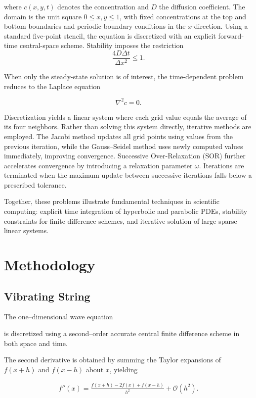 \documentclass[10pt, journal]{IEEEtran}
\begin{document}
where $c(x,y,t)$ denotes the concentration and $D$ the diffusion coefficient. The domain is the unit square $0 \le x,y \le 1$, with fixed concentrations at the top and bottom boundaries and periodic boundary conditions in the $x$-direction. Using a standard five-point stencil, the equation is discretized with an explicit forward-time central-space scheme. Stability imposes the restriction
\[
\frac{4D \Delta t}{\Delta x^2} \le 1.
\]

When only the steady-state solution is of interest, the time-dependent problem reduces to the Laplace equation

\begin{equation}
\nabla^2 c = 0.
\end{equation}

Discretization yields a linear system where each grid value equals the average of its four neighbors. Rather than solving this system directly, iterative methods are employed. The Jacobi method updates all grid points using values from the previous iteration, while the Gauss–Seidel method uses newly computed values immediately, improving convergence. Successive Over-Relaxation (SOR) further accelerates convergence by introducing a relaxation parameter $\omega$. Iterations are terminated when the maximum update between successive iterations falls below a prescribed tolerance.

Together, these problems illustrate fundamental techniques in scientific computing: explicit time integration of hyperbolic and parabolic PDEs, stability constraints for finite difference schemes, and iterative solution of large sparse linear systems.

\section{Methodology}

    \subsection{Vibrating String}
    
        The one–dimensional wave equation
        
        is discretized using a second–order accurate central finite difference scheme in both space and time.
        
        The second derivative is obtained by summing the Taylor expansions of $f(x+h)$ and $f(x-h)$ about $x$, yielding
        
        \begin{align}
        f''(x)=\frac{f(x+h) - 2f(x) + f(x-h)}{h^2}
        +\mathcal{O}(h^2).
        \label{eq:2nd_der}
        \end{align}
        
\end{document}
